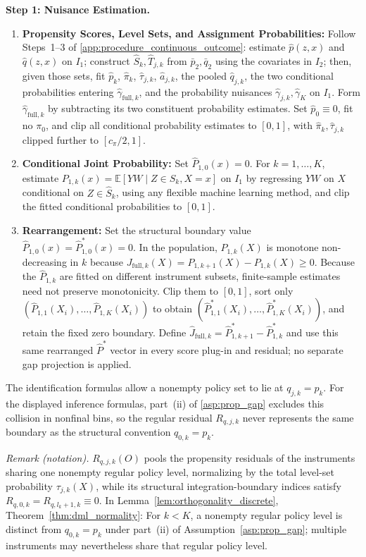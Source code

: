 \textbf{Step 1: Nuisance Estimation.}
\begin{enumerate}
    \item \textbf{Propensity Scores, Level Sets, and Assignment Probabilities:} Follow Steps~1--3 of \cref{app:procedure_continuous_outcome}: estimate $\hat p(z,x)$ and $\hat q(z,x)$ on $I_1$; construct $\widehat S_k,\widehat T_{j,k}$ from $\bar p_2,\bar q_2$ using the covariates in $I_2$; then, given those sets, fit $\hat p_k$, $\hat\pi_k$, $\hat\tau_{j,k}$, $\hat a_{j,k}$, the pooled $\hat q_{j,k}$, the two conditional probabilities entering $\hat\gamma_{\mathrm{full},k}$, and the probability nuisances $\hat\gamma_{j,k},\hat\gamma_K$ on $I_1$. Form $\hat\gamma_{\mathrm{full},k}$ by subtracting its two constituent probability estimates. Set $\hat p_0\equiv0$, fit no $\pi_0$, and clip all conditional probability estimates to $[0,1]$, with $\hat\pi_k,\hat\tau_{j,k}$ clipped further to $[c_\pi/2,1]$.
    \item \textbf{Conditional Joint Probability:} Set $\hat P_{1,0}(x)=0$. For $k=1,\ldots,K$, estimate $P_{1,k}(x) = \mathbb{E}[YW \mid Z \in S_k, X=x]$ on $I_1$ by regressing $YW$ on $X$ conditional on $Z \in \widehat{S}_k$, using any flexible machine learning method, and clip the fitted conditional probabilities to $[0,1]$.
    \item \textbf{Rearrangement:} Set the structural boundary value $\hat P_{1,0}(x)=\hat P_{1,0}^*(x)=0$. In the population, $P_{1,k}(X)$ is monotone non-decreasing in $k$ because $J_{\mathrm{full},k}(X)=P_{1,k+1}(X)-P_{1,k}(X)\geqslant0$. Because the $\hat P_{1,k}$ are fitted on different instrument subsets, finite-sample estimates need not preserve monotonicity. Clip them to $[0,1]$, sort only $(\hat P_{1,1}(X_i),\ldots,\hat P_{1,K}(X_i))$ to obtain $(\hat P^*_{1,1}(X_i),\ldots,\hat P^*_{1,K}(X_i))$, and retain the fixed zero boundary. Define $\hat J_{\mathrm{full},k}=\hat P^*_{1,k+1}-\hat P^*_{1,k}$ and use this same rearranged $\hat P^*$ vector in every score plug-in and residual; no separate gap projection is applied.
\end{enumerate}

The identification formulas allow a nonempty policy set to lie at $q_{j,k}=p_k$. For the displayed inference formulas, part~\textup{(ii)} of \cref{asp:prop_gap} excludes this collision in nonfinal bins, so the regular residual $R_{q,j,k}$ never represents the same boundary as the structural convention $q_{0,k}=p_k$.

\noindent\textit{Remark (notation).} $R_{q,j,k}(O)$ pools the propensity residuals of the instruments sharing one nonempty regular policy level, normalizing by the total level-set probability $\tau_{j,k}(X)$, while its structural integration-boundary indices satisfy $R_{q,0,k}=R_{q,l_k+1,k}\equiv0$. In Lemma~\ref{lem:orthogonality_discrete}, Theorem~\ref{thm:dml_normality}: For $k<K$, a nonempty regular policy level is distinct from $q_{0,k}=p_k$ under part~\textup{(ii)} of Assumption~\ref{asp:prop_gap}; multiple instruments may nevertheless share that regular policy level.


